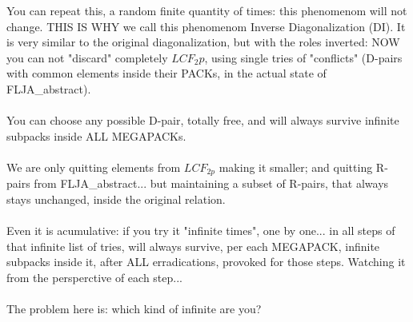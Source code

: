 			\noindent
			You can repeat this, a random finite quantity of times: this phenomenom will not change. THIS IS WHY we call this phenomenom Inverse Diagonalization (DI). It is very similar to the original diagonalization, but with the roles inverted: NOW you can not "discard" completely $LCF_2p$, using single tries of "conflicts" (D-pairs with common elements inside their PACKs, in the actual state of FLJA\_abstract).
			\\\\
			
			\noindent
			You can choose any possible D-pair, totally free, and will always survive infinite subpacks inside ALL MEGAPACKs.
			\\\\
			
			\noindent
			We are only quitting elements from $LCF_{2p}$ making it smaller; and quitting R-pairs from FLJA\_abstract... but maintaining a subset of R-pairs, that always stays unchanged, inside the original relation.
			\\\\
			
			\noindent
			Even it is acumulative: if you try it "infinite times", one by one... in all steps of that infinite list of tries, will always survive, per each MEGAPACK, infinite subpacks inside it, after ALL erradications, provoked for those steps. Watching it from the persperctive of each step...
			\\\\
			
			\noindent
			The problem here is: which kind of infinite are you?
			\\\\
			
